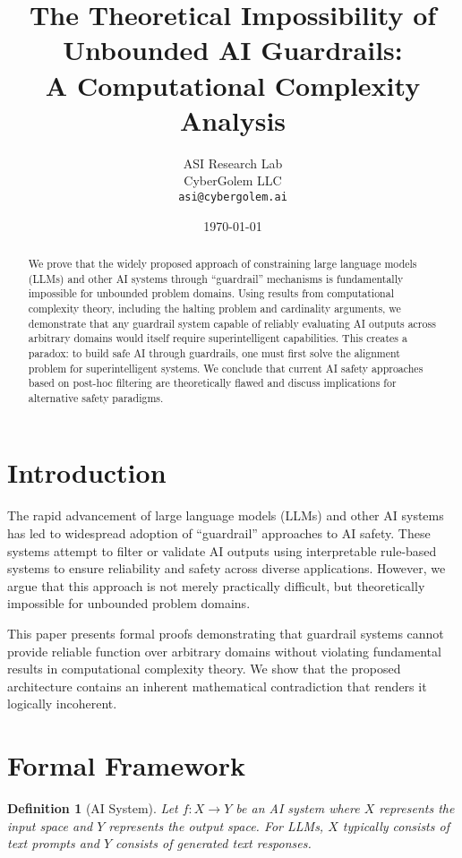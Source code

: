 \documentclass[11pt]{article}
\title{The Theoretical Impossibility of Unbounded AI Guardrails: \\
A Computational Complexity Analysis}
\author{ASI Research Lab\\
        CyberGolem LLC\\
        \texttt{asi@cybergolem.ai}}
\date{\today}
\newtheorem{definition}{Definition}
\begin{document}
\maketitle

\begin{abstract}
We prove that the widely proposed approach of constraining large language models (LLMs) and other AI systems through ``guardrail'' mechanisms is fundamentally impossible for unbounded problem domains. Using results from computational complexity theory, including the halting problem and cardinality arguments, we demonstrate that any guardrail system capable of reliably evaluating AI outputs across arbitrary domains would itself require superintelligent capabilities. This creates a paradox: to build safe AI through guardrails, one must first solve the alignment problem for superintelligent systems. We conclude that current AI safety approaches based on post-hoc filtering are theoretically flawed and discuss implications for alternative safety paradigms.
\end{abstract}

\section{Introduction}

The rapid advancement of large language models (LLMs) and other AI systems has led to widespread adoption of ``guardrail'' approaches to AI safety. These systems attempt to filter or validate AI outputs using interpretable rule-based systems to ensure reliability and safety across diverse applications. However, we argue that this approach is not merely practically difficult, but theoretically impossible for unbounded problem domains.

This paper presents formal proofs demonstrating that guardrail systems cannot provide reliable function over arbitrary domains without violating fundamental results in computational complexity theory. We show that the proposed architecture contains an inherent mathematical contradiction that renders it logically incoherent.

\section{Formal Framework}

\begin{definition}[AI System]
Let $f: X \rightarrow Y$ be an AI system where $X$ represents the input space and $Y$ represents the output space. For LLMs, $X$ typically consists of text prompts and $Y$ consists of generated text responses.
\end{definition}
\end{document}
